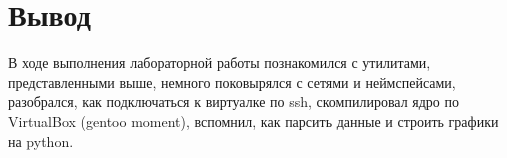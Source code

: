 \documentclass[11pt, a4paper]{article}
\begin{document}
\newpage

\section{Вывод}
В ходе выполнения лабораторной работы познакомился с утилитами, представленными выше, немного
поковырялся с сетями и неймспейсами, разобрался, как подключаться к виртуалке по ssh, скомпилировал
ядро по VirtualBox (gentoo moment), вспомнил, как парсить данные и строить графики на python.
\end{document}
